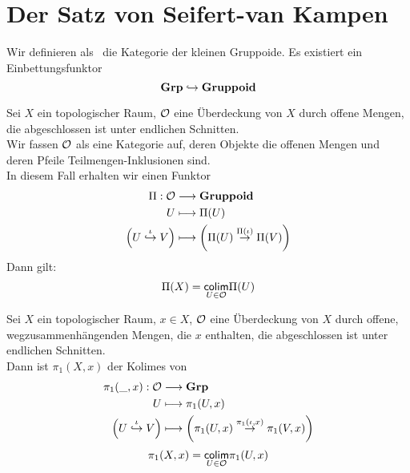 \section{Der Satz von Seifert-van Kampen}

\Bem{}
Wir definieren als \GRP\ die Kategorie der kleinen Gruppoide. Es existiert ein Einbettungsfunktor
\[\textbf{Grp} \overset{}{\hookrightarrow} \textbf{Gruppoid}\]

Sei $X$ ein topologischer Raum, $\mathcal{O}$ eine Überdeckung von $X$ durch offene Mengen, die abgeschlossen ist unter endlichen Schnitten.\\
Wir fassen $\mathcal{O}$ als eine Kategorie auf, deren Objekte die offenen Mengen und deren Pfeile Teilmengen-Inklusionen sind.\\
In diesem Fall erhalten wir einen Funktor
\begin{align*}
\Pi : \mathcal{O} & \longrightarrow  \textbf{Gruppoid}\\
U & \longmapsto  \Pi(U)\\
\left(U\overset{\iota}{\hookrightarrow} V\right) & \longmapsto  \left(\Pi(U) \overset{\Pi(\iota)}{\rightarrow} \Pi(V)\right)
\end{align*}
Dann gilt:
\[\Pi(X) = \underset{U \in \mathcal{O}}{\textsf{colim}}\Pi(U)\]

Sei $X$ ein topologischer Raum, $x \in X$, $\mathcal{O}$ eine Überdeckung von $X$ durch offene, wegzusammenhängenden Mengen, die $x$ enthalten, die abgeschlossen ist unter endlichen Schnitten.\\
Dann ist $\pi_1(X,x)$ der Kolimes von
\begin{align*}
\pi_1(\_, x) : \mathcal{O} & \longrightarrow \textbf{Grp}\\
U & \longmapsto  \pi_1(U, x)\\
\left(U\overset{\iota}{\hookrightarrow} V\right) & \longmapsto  \left(\pi_1(U,x) \overset{\pi_1(\iota,x)}{\rightarrow} \pi_1(V,x)\right)
\end{align*}
\[\pi_1(X,x) = \underset{U \in \mathcal{O}}{\textsf{colim}}\pi_1(U,x)\]

